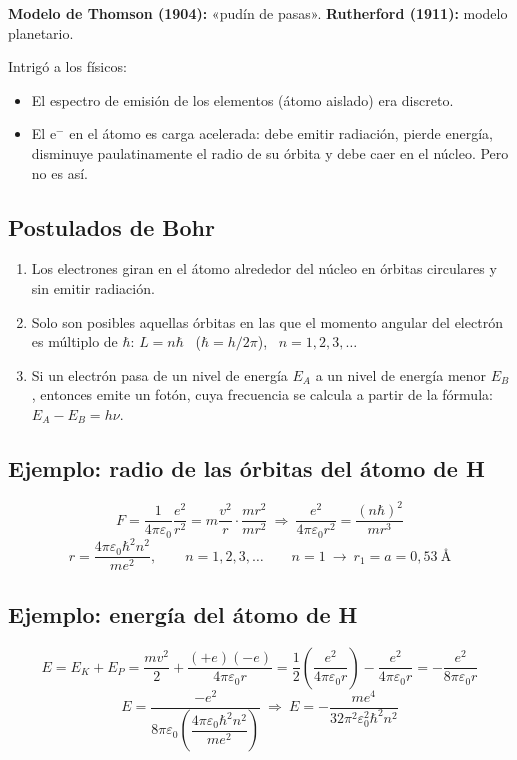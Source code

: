 \documentclass[11pt,a4paper]{article}
\begin{document}
\textbf{Modelo de Thomson (1904):} «pudín de pasas».\qquad
\textbf{Rutherford (1911):} modelo planetario.

Intrigó a los físicos:
\begin{itemize}
  \item El espectro de emisión de los elementos (átomo aislado) era discreto.
  \item El e$^-$ en el átomo es carga acelerada: debe emitir radiación, pierde energía, disminuye paulatinamente
        el radio de su órbita y debe caer en el núcleo. Pero no es así.
\end{itemize}

\subsection{Postulados de Bohr}
\begin{enumerate}
  \item Los electrones giran en el átomo alrededor del núcleo en órbitas circulares y sin emitir radiación.
  \item Solo son posibles aquellas órbitas en las que el momento angular del electrón es múltiplo de $\hbar$:
        $L=n\hbar$ \ ($\hbar=h/2\pi$), \ $n=1,2,3,\ldots$
  \item Si un electrón pasa de un nivel de energía $E_A$ a un nivel de energía menor $E_B$, entonces emite un
        fotón, cuya frecuencia se calcula a partir de la fórmula: $E_A-E_B=h\nu$.
\end{enumerate}

\subsection{Ejemplo: radio de las órbitas del átomo de H}
\[
F=\frac{1}{4\pi\varepsilon_0}\frac{e^2}{r^2}=m\frac{v^2}{r}\cdot\frac{mr^2}{mr^2}
\ \Rightarrow\
\frac{e^2}{4\pi\varepsilon_0r^2}=\frac{(n\hbar)^2}{mr^3}
\]
\[
\boxed{r=\frac{4\pi\varepsilon_0\hbar^2n^2}{me^2}},\qquad n=1,2,3,\ldots\qquad n=1\ \rightarrow\ r_1=a=0{,}53\ \text{Å}
\]

\subsection{Ejemplo: energía del átomo de H}
\[
E=E_K+E_P=\frac{mv^2}{2}+\frac{(+e)(-e)}{4\pi\varepsilon_0r}
=\frac12\left(\frac{e^2}{4\pi\varepsilon_0r}\right)-\frac{e^2}{4\pi\varepsilon_0r}=-\frac{e^2}{8\pi\varepsilon_0r}
\]
\[
E=\frac{-e^2}{8\pi\varepsilon_0\left(\dfrac{4\pi\varepsilon_0\hbar^2n^2}{me^2}\right)}
\ \Rightarrow\
\boxed{E=-\frac{me^4}{32\pi^2\varepsilon_0^2\hbar^2n^2}}
\]
\end{document}
